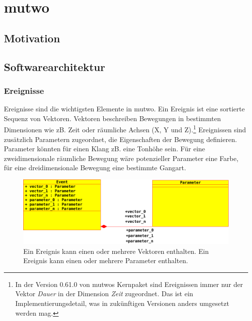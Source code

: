 \documentclass[12pt,a4paper,ngerman]{article}
\begin{document}

\section{mutwo}

\subsection{Motivation}

\subsection{Softwarearchitektur}

\subsubsection{Ereignisse}

Ereignisse sind die wichtigsten Elemente in mutwo.
Ein Ereignis ist eine sortierte Sequenz von Vektoren.
Vektoren beschreiben Bewegungen in bestimmten Dimensionen wie zB. Zeit oder räumliche Achsen (X, Y und Z).\footnote{%
        In der Version 0.61.0 von mutwos Kernpaket sind Ereignissen immer nur der Vektor \emph{Dauer} in der Dimension \emph{Zeit} zugeordnet.
        Das ist ein Implementierungsdetail, was in zukünftigen Versionen anders umgesetzt werden mag.
}
Ereignissen sind zusätzlich Parametern zugeordnet, die Eigenschaften der Bewegung definieren.
Parameter könnten für einen Klang zB. eine Tonhöhe sein.
Für eine zweidimensionale räumliche Bewegung wäre potenzieller Parameter eine Farbe, für eine dreidimensionale Bewegung eine bestimmte Gangart.

\begin{figure}[h!]
    \includegraphics[scale=0.4]{uml_diagrams/event_parameter_basic_150.png}

    \caption{%
        Ein Ereignis kann einen oder mehrere Vektoren enthalten.
        Ein Ereignis kann einen oder mehrere Parameter enthalten.
    }
\end{figure}
\end{document}
